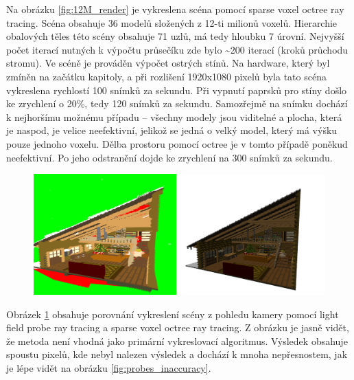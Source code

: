 Na obrázku \ref{fig:12M_render} je vykreslena scéna pomocí sparse voxel octree ray tracing. Scéna obsahuje 36 modelů složených z 12-ti milionů voxelů. Hierarchie obalových těles této scény obsahuje 71 uzlů, má tedy hloubku 7 úrovní. Nejvyšší počet iterací nutných k výpočtu průsečíku zde bylo \textasciitilde{}200 iterací (kroků průchodu stromu). Ve scéně je prováděn výpočet ostrých stínů. Na hardware, který byl zmíněn na začátku kapitoly, a při rozlišení 1920x1080 pixelů byla tato scéna vykreslena rychlostí 100 snímků za sekundu. Při vypnutí paprsků pro stíny došlo ke zrychlení o 20\%, tedy 120 snímků za sekundu. Samozřejmě na snímku dochází k nejhoršímu možnému případu -- všechny modely jsou viditelné a plocha, která je naspod, je velice neefektivní, jelikož se jedná o velký model, který má výšku pouze jednoho voxelu. Dělba prostoru pomocí octree je v tomto případě poněkud neefektivní.  Po jeho odstranění dojde ke zrychlení na 300 snímků za sekundu. 

\begin{figure}[H]
	\centering
	\captionsetup{justification=centering}
	\includegraphics[scale=1]{images/render_probe_vs_svo.png}
	\label{fig:probe_vs_svo_render}
\end{figure}

Obrázek \ref{fig:probe_vs_svo_render} obsahuje porovnání vykreslení scény z pohledu kamery pomocí light field probe ray tracing a sparse voxel octree ray tracing. Z obrázku je jasně vidět, že metoda není vhodná jako primární vykreslovací algoritmus. Výsledek obsahuje spoustu pixelů, kde nebyl nalezen výsledek a dochází k mnoha nepřesnostem, jak je lépe vidět na obrázku \ref{fig:probes_inaccuracy}.

